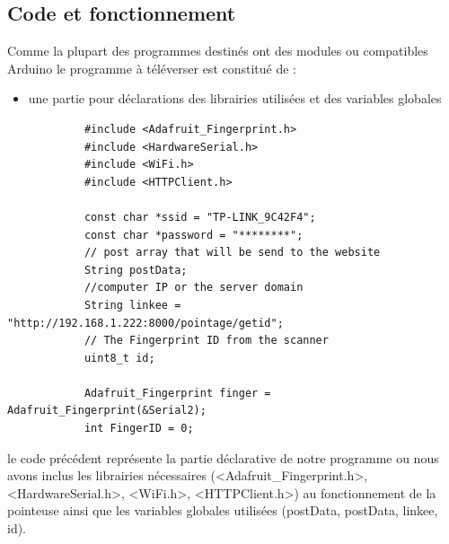\subsection{Code et fonctionnement}    
Comme la plupart des programmes destinés ont des modules ou compatibles Arduino 
le programme à téléverser est constitué de : 
    
    \begin{itemize}
        \item [\textbullet] une partie pour déclarations des librairies utilisées et des 
        variables globales
    \end{itemize}
    \begin{verbatim}
            #include <Adafruit_Fingerprint.h>
            #include <HardwareSerial.h>
            #include <WiFi.h>
            #include <HTTPClient.h>

            const char *ssid = "TP-LINK_9C42F4";
            const char *password = "********";
            // post array that will be send to the website
            String postData;    
            //computer IP or the server domain 
            String linkee = "http://192.168.1.222:8000/pointage/getid"; 
            // The Fingerprint ID from the scanner
            uint8_t id; 

            Adafruit_Fingerprint finger = Adafruit_Fingerprint(&Serial2);
            int FingerID = 0;
    \end{verbatim}
le code précédent représente la partie déclarative de notre programme ou nous 
avons inclus les librairies nécessaires (<Adafruit\_Fingerprint.h>, 
<HardwareSerial.h>, <WiFi.h>, <HTTPClient.h>) au fonctionnement de la pointeuse 
ainsi que les variables globales utilisées (postData, postData, linkee, id).
        
